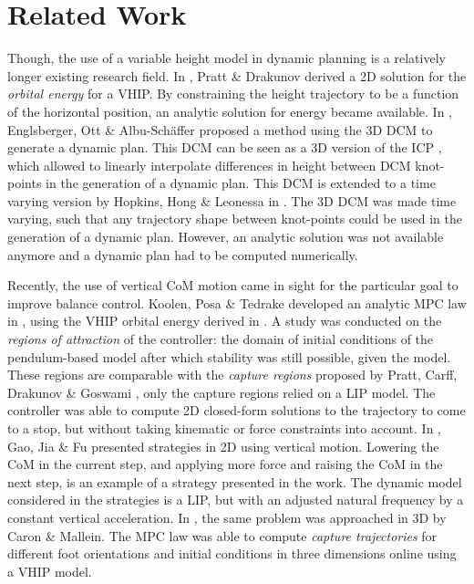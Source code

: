 \section{Related Work}
Though, the use of a variable height model in dynamic planning is a relatively longer existing research field. In \cite{pratt2007derivation}, Pratt \& Drakunov derived a \ac{2D} solution for the \textit{orbital energy} for a \ac{VHIP}. By constraining the height trajectory to be a function of the horizontal position, an analytic solution for energy became available. In \cite{englsberger2013three}, Englsberger, Ott \& Albu-Sch{\"a}ffer proposed a method using the \ac{3D} \ac{DCM} to generate a dynamic plan. This \ac{DCM} can be seen as a \ac{3D} version of the \ac{ICP} \cite{koolen2012capturability}, which allowed to linearly interpolate differences in height between \ac{DCM} knot-points in the generation of a dynamic plan.  This \ac{DCM} is extended to a time varying version by Hopkins, Hong \& Leonessa in \cite{hopkins2014humanoid}. The \ac{3D} \ac{DCM} was made time varying, such that any trajectory shape between knot-points could be used in the generation of a dynamic plan. However, an analytic solution was not available anymore and a dynamic plan had to be computed numerically. 

Recently, the use of vertical \ac{CoM} motion came in sight for the particular goal to improve balance control. Koolen, Posa \& Tedrake developed an analytic \ac{MPC} law in \cite{koolen2016balance}, using the \ac{VHIP} orbital energy derived in \cite{pratt2007derivation}. A study was conducted on the \textit{regions of attraction} of the controller: the domain of initial conditions of the pendulum-based model after which stability was still possible, given the model. These regions are comparable with the \textit{capture regions} proposed by Pratt, Carff, Drakunov \& Goswami \cite{pratt2006capture}, only the capture regions relied on a \ac{LIP} model. The controller was able to compute \ac{2D} closed-form solutions to the trajectory to come to a stop, but without taking kinematic or force constraints into account. In \cite{gao2017increase}, Gao, Jia \& Fu presented strategies in \ac{2D} using vertical motion. Lowering the \ac{CoM} in the current step, and applying more force and raising the \ac{CoM} in the next step, is an example of a strategy presented in the work. The dynamic model considered in the strategies is a \ac{LIP}, but with an adjusted natural frequency by a constant vertical acceleration. In \cite{caron2018balance}, the same problem was approached in \ac{3D} by Caron \& Mallein. The \ac{MPC} law was able to compute \textit{capture trajectories} for different foot orientations and initial conditions in three dimensions online using a \ac{VHIP} model.


